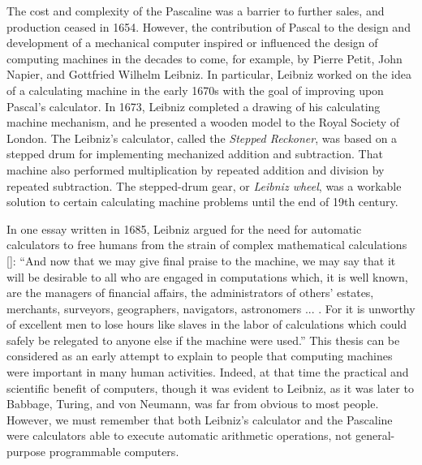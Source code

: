 {{{The cost and complexity of the Pascaline was a barrier to further sales, and production ceased in 1654. However, the contribution of Pascal to the design and development of a mechanical computer inspired or influenced the design of computing machines in the decades to come, for example, by Pierre Petit, John Napier, and Gottfried Wilhelm Leibniz. In particular, Leibniz worked on the idea of a calculating machine in the early 1670s with the goal of improving upon Pascal's calculator. In 1673, Leibniz completed a drawing of his calculating machine mechanism, and he presented a wooden model to the Royal Society of London. The Leibniz's calculator, called the \textit{Stepped Reckoner}, was based on a stepped drum for implementing mechanized addition and subtraction. That machine also performed multiplication by repeated addition and division by repeated subtraction. The stepped-drum gear, or \textit{Leibniz wheel}, was a workable solution to certain calculating machine problems until the end of 19th century.

In one essay written in 1685, Leibniz argued for the need for automatic calculators to free humans from the strain of complex mathematical calculations [\citealt{chap:01:Leibniz:1929}]: ``And now that we may give final praise to the machine, we may say that it will be desirable to all who are engaged in computations which, it is well known, are the managers of financial affairs, the administrators of others' estates, merchants, surveyors, geographers, navigators, astronomers ... . For it is unworthy of excellent men to lose hours like slaves in the labor of calculations which could safely be relegated to anyone else if the machine were used.'' This thesis can be considered as an early attempt to explain to people that computing machines were important in many human activities. Indeed, at that time the practical and scientific benefit of computers, though it was evident to Leibniz, as it was later to Babbage,\vadjust{\vspace*{10pt}\pagebreak} Turing, and von Neumann, was far from obvious to most people. However, we must remember that both Leibniz's calculator and the Pascaline were calculators able to execute automatic arithmetic operations, not general-purpose programmable computers.

}}}
